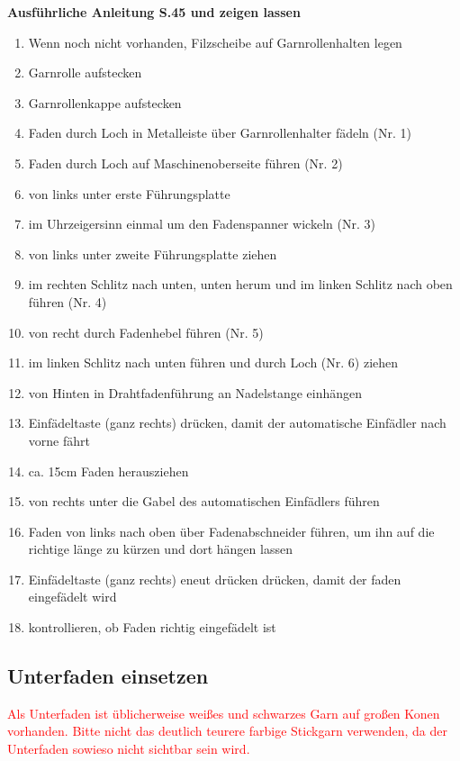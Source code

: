 \documentclass{\basedir/fablab-document}
\begin{document}
\textbf{Ausführliche Anleitung S.45 und zeigen lassen}
\begin{enumerate}
	\item Wenn noch nicht vorhanden, Filzscheibe auf Garnrollenhalten legen
	\item Garnrolle aufstecken
	\item Garnrollenkappe aufstecken
	\item Faden durch Loch in Metalleiste über Garnrollenhalter fädeln (Nr. 1)
	\item Faden durch Loch auf Maschinenoberseite führen (Nr. 2)
	\item von links unter erste Führungsplatte 
	\item im Uhrzeigersinn einmal um den Fadenspanner wickeln (Nr. 3)
	\item von links unter zweite Führungsplatte ziehen
	\item im rechten Schlitz nach unten, unten herum und im linken Schlitz nach oben führen (Nr. 4)
	\item von recht durch Fadenhebel führen (Nr. 5)
	\item im linken Schlitz nach unten führen und durch Loch (Nr. 6) ziehen
	\item von Hinten in Drahtfadenführung an Nadelstange einhängen
	\item Einfädeltaste (ganz rechts) drücken, damit der automatische Einfädler nach vorne fährt
	\item ca. 15cm Faden herausziehen
	\item von rechts unter die Gabel des automatischen Einfädlers führen
	\item Faden von links nach oben über Fadenabschneider führen, um ihn auf die richtige länge zu kürzen und dort hängen lassen
	\item Einfädeltaste (ganz rechts) eneut drücken drücken, damit der faden eingefädelt wird
	\item kontrollieren, ob Faden richtig eingefädelt ist
\end{enumerate}

\vspace{2em}

\subsection{Unterfaden einsetzen}
\textcolor{red}{Als Unterfaden ist üblicherweise weißes und schwarzes Garn auf großen Konen vorhanden. Bitte nicht das deutlich teurere farbige Stickgarn verwenden, da der Unterfaden sowieso nicht sichtbar sein wird.}
\end{document}
